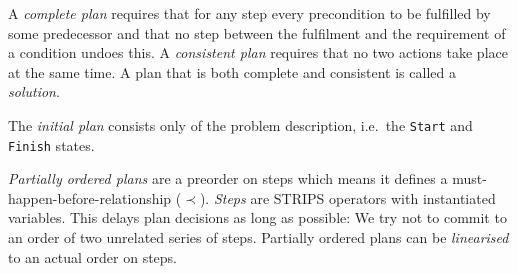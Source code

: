 \documentclass[english]{panikzettel}
\begin{document}
A \emph{complete plan} requires that for any step every precondition to be fulfilled by some predecessor and that no step between the fulfilment and the requirement of a condition undoes this.
A \emph{consistent plan} requires that no two actions take place at the same time.
A plan that is both complete and consistent is called a \emph{solution}.

The \emph{initial plan} consists only of the problem description, i.e.\ the \texttt{Start} and \texttt{Finish} states.

\emph{Partially ordered plans} are a preorder on steps which means it defines a must-happen-before-relationship ($\prec$).
\emph{Steps} are STRIPS operators with instantiated variables.
This delays plan decisions as long as possible: We try not to commit to an order of two unrelated series of steps.
Partially ordered plans can be \emph{linearised} to an actual order on steps.
\end{document}
